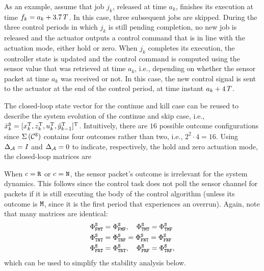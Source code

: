 As an example, assume that job $j_k$, released at time $a_k$, finishes its execution at time $f_k = a_k + 3.7\,T$.
In this case, three subsequent jobs are skipped.
During the three control periods in which $j_k$ is still pending completion, no new job is released and the actuator outputs a control command that is in line with the actuation mode, either hold or zero.
When $j_k$ completes its execution, the controller state is updated and the control command is computed using the sensor value that was retrieved at time $a_k$, i.e., depending on whether the sensor packet at time $a_k$ was received or not.
In this case, the new control signal is sent to the actuator at the end of the control period, at time instant $a_k+4\,T$.

The closed-loop state vector for the continue and kill case can be reused to describe the system evolution of the continue and skip case, i.e., $\tilde x_k^{\texttt{S}} = [ x_k^{\mathrm{\small{T}}}{}, z_k^{\mathrm{\small{T}}}{}, u_k^{\mathrm{\small{T}}}{}, \hat y_{k-1}^{\mathrm{\small{T}}}{} ]^{\mathrm{\small{T}}}{}$.
Intuitively, there are $16$ possible outcome configurations since $\Sigma\,({\mathcal{C}^{\texttt{S}}}){}$ contains four outcomes rather than two, i.e., $2^2\cdot 4=16$.
Using $\Delta_{\mathcal{A}} = I$ and $\Delta_{\mathcal{A}} = 0$ to indicate, respectively, the hold and zero actuation mode, the closed-loop matrices are
%

When $c=\texttt{R}$ or $c=\texttt{N}$, the sensor packet's outcome is irrelevant for the system dynamics.
This follows since the control task does not poll the sensor channel for packets if it is still executing the body of the control algorithm (unless its outcome is $\texttt{M}$, since it is the first period that experiences an overrun).
Again, note that many matrices are identical:
\begin{align*}
    \Phi^{\texttt{S}}_{\texttt{F}\texttt{M}\texttt{T}} &= \Phi^{\texttt{S}}_{\texttt{F}\texttt{M}\texttt{F}},\quad \Phi^{\texttt{S}}_{\texttt{T}\texttt{M}\texttt{T}} = \Phi^{\texttt{S}}_{\texttt{T}\texttt{M}\texttt{F}} \\
    \Phi^{\texttt{S}}_{\texttt{T}\texttt{N}\texttt{T}} &= \Phi^{\texttt{S}}_{\texttt{T}\texttt{N}\texttt{F}} = \Phi^{\texttt{S}}_{\texttt{F}\texttt{N}\texttt{T}} = \Phi^{\texttt{S}}_{\texttt{F}\texttt{N}\texttt{F}} \\
    \Phi^{\texttt{S}}_{\texttt{F}\texttt{R}\texttt{T}} &= \Phi^{\texttt{S}}_{\texttt{T}\texttt{R}\texttt{T}},\quad \Phi^{\texttt{S}}_{\texttt{F}\texttt{R}\texttt{F}} = \Phi^{\texttt{S}}_{\texttt{T}\texttt{R}\texttt{F}},
\end{align*}
which can be used to simplify the stability analysis below.

